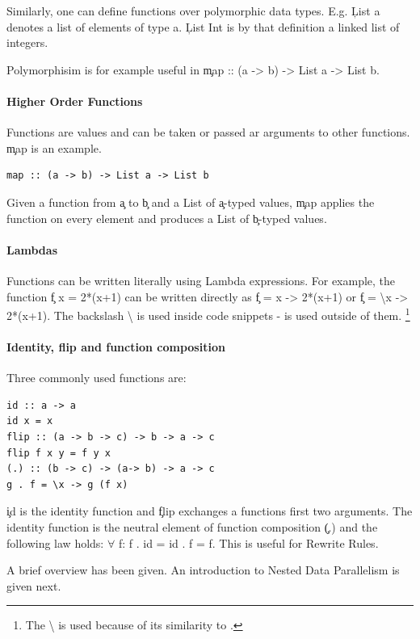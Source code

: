     Similarly, one can define functions over polymorphic data types.
    E.g. \c{List a} denotes a list of elements of type a. \c{List Int}
    is by that definition a linked list of integers.
    
    Polymorphisim is for example useful in \c{map :: (a -> b) -> List a -> List b}.
  
  \paragraph{Higher Order Functions}
    Functions are values and can be taken or passed ar arguments to other functions.
    \c{map} is an example.
    \begin{lstlisting}
map :: (a -> b) -> List a -> List b
    \end{lstlisting}
    Given a function from \c{a} to \c{b} and a List of \c{a}-typed values,
    \c{map} applies the function on every element and produces a List
    of \c{b}-typed values.
    
  \paragraph{Lambdas}
    Functions can be written literally using Lambda expressions.
    For example, the function \c{f x = 2*(x+1)} can be written
    directly as \c{f = \lam x -> 2*(x+1)} or \c{f = \textbackslash{x} -> 2*(x+1)}.
    The backslash \textbackslash{} is used inside code snippets - \lam{} is used outside of them.
    \footnote{The \textbackslash{} is used because of its similarity to \lam.}
    
  \paragraph{Identity, flip and function composition}
    Three commonly used functions are:
    \begin{lstlisting}
id :: a -> a
id x = x
flip :: (a -> b -> c) -> b -> a -> c
flip f x y = f y x
(.) :: (b -> c) -> (a-> b) -> a -> c
g . f = \x -> g (f x)
    \end{lstlisting}
    \c{id} is the identity function and \c{flip} exchanges a functions
    first two arguments.
    The identity function is the neutral element of function composition \c{(.)}
    and the following law holds:
     \c{\textrm{$\forall$} f: f . id = id . f = f}. This is useful for Rewrite Rules.


  \p
  A brief overview has been given. An introduction to Nested Data Parallelism is given next.



